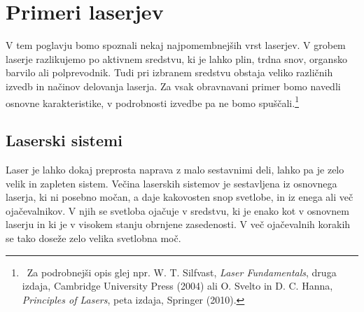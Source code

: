 \chapter{Primeri laserjev}
\label{chap:Primeri}
V tem poglavju bomo spoznali nekaj najpomembnejših vrst laserjev.
V grobem laserje razlikujemo po aktivnem sredstvu, ki je lahko plin, trdna snov, 
organsko barvilo ali polprevodnik. Tudi pri izbranem
sredstvu obstaja veliko različnih izvedb in načinov delovanja laserja. Za vsak 
obravnavani primer bomo navedli osnovne karakteristike, v podrobnosti 
izvedbe pa ne bomo spuščali.\footnote{~Za podrobnejši opis glej npr. W. T. Silfvast,
{\it Laser Fundamentals}, druga izdaja, Cambridge University Press (2004) ali
O. Svelto in D. C. Hanna, {\it Principles of Lasers}, peta izdaja, Springer (2010).}

\section{Laserski sistemi}
Laser  je lahko dokaj preprosta naprava z malo sestavnimi deli,
lahko pa je zelo velik in zapleten sistem. Večina laserskih sistemov
je sestavljena iz osnovnega laserja, ki ni posebno močan, a daje kakovosten
snop svetlobe, in iz enega ali več ojačevalnikov. V njih se svetloba 
ojačuje v sredstvu, ki je enako kot v osnovnem laserju in ki je v 
visokem stanju obrnjene zasedenosti. V več ojačevalnih korakih 
se tako doseže zelo velika svetlobna moč. 

